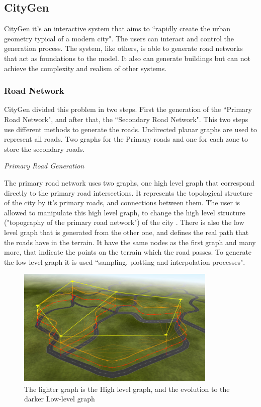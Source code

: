 
\subsection{CityGen} %
\label{sec:citygen}
\cite{Kelly2008}

CityGen it's an interactive system that aims  to ``rapidly create the urban geometry typical of a modern city". The users can interact and control the generation process. The system, like others, is able to generate road networks that act as foundations to the model. It also can generate buildings but can not achieve the complexity and realism of other systems.


\subsubsection{Road Network} %
\label{ssub:road_network}


CityGen divided this problem in two steps. First the generation of the ``Primary Road Network", and after that, the ``Secondary Road Network". This two steps use different methods to generate the roads.
Undirected planar graphs are used to represent all roads. Two graphs for the Primary roads and one for each zone to store the secondary roads.


\emph{Primary Road Generation}

The primary road network uses two graphs, one high level graph that correspond directly to the primary road intersections. It represents the topological structure of the city by it's primary roads, and connections between them. The user is allowed to manipulate this high level graph, to change the high level structure ("topography of the primary road network") of the city .
There is also the low level graph that is generated from the other one, and defines the real path that the roads have in the terrain. It have the same nodes as the first graph and many more, that indicate the points on the terrain which the road passes.
To generate the low level graph it is used ``sampling, plotting and interpolation processes".


	

\begin{figure}[htbp]
	\centering
	\includegraphics[width=0.85\textwidth]{img/CityGen/RoadGraphs.png}
	\caption{The lighter graph is the High level graph, and the evolution to the darker Low-level graph }
	\label{fig:graphs}
\end{figure}

